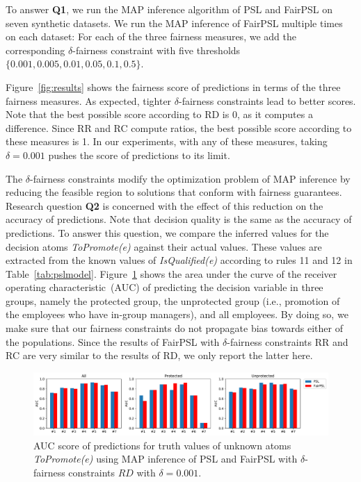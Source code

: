 \documentclass[11pt]{article}
\begin{document}
To answer \textbf{Q1}, we run the MAP inference algorithm of PSL and FairPSL on seven synthetic datasets. 
We run the MAP inference of FairPSL multiple times on each dataset: For each of the three fairness measures, we add the corresponding $\delta$-fairness constraint with five thresholds $\{0.001, 0.005, 0.01, 0.05, 0.1, 0.5\}$.

Figure~\ref{fig:results} shows the fairness score of predictions in terms of the three fairness measures. As expected, tighter $\delta$-fairness constraints lead to better scores. Note that the best possible score according to RD is 0, as it computes a difference. Since RR and RC compute ratios, the best possible score according to these measures is 1. In our experiments, with any of these measures, taking $\delta = 0.001$ pushes the score of predictions to its limit.  

The $\delta$-fairness constraints modify the optimization problem of MAP inference by reducing the feasible region to solutions that conform with fairness guarantees. Research question \textbf{Q2} is concerned with the effect of this reduction on the accuracy of predictions. Note that decision quality is the same as the accuracy of predictions. To answer this question, we compare the inferred values for the decision atoms \textit{ToPromote(e)} against their actual values. These values are extracted from the known values of \textit{IsQualified(e)} according to rules 11 and 12 in Table~\ref{tab:pslmodel}. Figure~\ref{fig:accuracy} shows the area under the curve of the receiver operating characteristic~(AUC) of predicting the decision variable in three groups, namely the protected group, the unprotected group (i.e., promotion of the employees who have in-group managers), and all employees. By doing so, we make sure that our fairness constraints do not propagate bias towards either of the populations. Since the results of FairPSL with $\delta$-fairness constraints RR and RC are very similar to the results of RD, we only report the latter here.


\begin{figure}
    \centering
    \includegraphics[width=\textwidth]{figs/roc.pdf}
    \caption{\small AUC score of predictions for truth values of unknown atoms \textit{ToPromote(e)} using MAP inference of PSL and FairPSL with $\delta$-fairness constraints $RD$ with $\delta=0.001$.}
    \label{fig:accuracy}
\end{figure}
\end{document}
